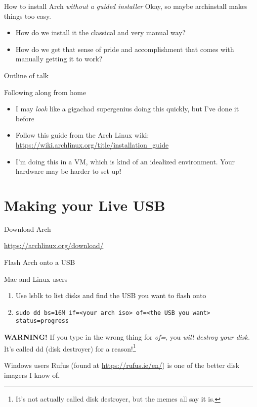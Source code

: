 \documentclass{beamer}
\begin{document}
\begin{frame}{How to install Arch \textit{without a guided installer}}
    Okay, so maybe archinstall makes things too easy.
    \begin{itemize}
        \item How do we install it the classical and very manual way?
        \item How do we get that sense of pride and accomplishment that comes with manually getting it to work?
    \end{itemize}
\end{frame}

\begin{frame}{Outline of talk}
    \tableofcontents
\end{frame}

\begin{frame}{Following along from home}
    \begin{itemize}
        \item I may \textit{look} like a gigachad supergenius doing this quickly, but I've done it before
        \item Follow this guide from the Arch Linux wiki: \url{https://wiki.archlinux.org/title/installation_guide}
        \item I'm doing this in a VM, which is kind of an idealized environment. Your hardware may be harder to set up!
    \end{itemize}
\end{frame}

\section{Making your Live USB}

\begin{frame}{Download Arch}
    \large

    \url{https://archlinux.org/download/}
\end{frame}

\begin{frame}{Flash Arch onto a USB}

    \begin{block}{Mac and Linux users}
        \begin{enumerate}
            \item Use lsblk to list disks and find the USB you want to flash onto
            \item \texttt{sudo dd bs=16M if=<your arch iso> of=<the USB you want> status=progress}
        \end{enumerate}

        \textbf{WARNING!} If you type in the wrong thing for \textit{of=}, you \textit{will destroy your disk.} It's called dd (disk destroyer) for a reason!\footnote{It's not actually called disk destroyer, but the memes all say it is.}
    \end{block}

    \begin{block}{Windows users}
        Rufus (found at \url{https://rufus.ie/en/}) is one of the better disk imagers I know of.
\end{block}
\end{frame}
\end{document}
